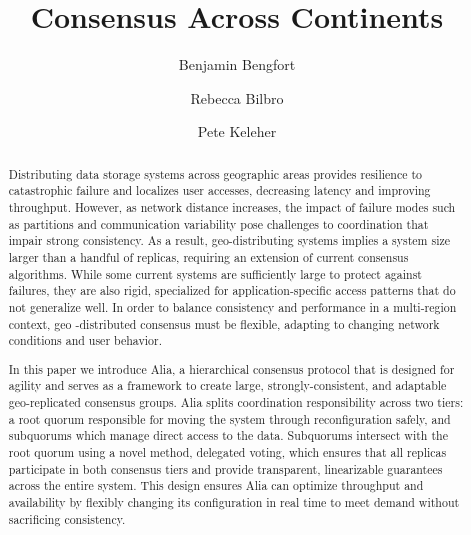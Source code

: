 \documentclass[sigplan,screen,review,anonymous,nonacm]{acmart}
\begin{document}
\title{Consensus Across Continents}

\author{Benjamin Bengfort}
\orcid{}

\author{Rebecca Bilbro}
\orcid{}

\author{Pete Keleher}
\orcid{}



\begin{abstract}
Distributing data storage systems across geographic areas provides resilience
to catastrophic failure and localizes user accesses, decreasing latency and improving 
throughput. 
However, as network distance increases, the impact of failure modes such as partitions 
and communication variability pose challenges to coordination that impair strong 
consistency.
As a result, geo-distributing systems implies a system size larger than a handful of 
replicas, requiring an extension of current consensus algorithms.
While some current systems are sufficiently large to protect against failures, they are 
also rigid, specialized for application-specific access patterns that do not generalize 
well. 
In order to balance consistency and performance in a multi-region context, geo -distributed
consensus must be flexible, adapting to changing network conditions and user behavior. 

In this paper we introduce Alia, a hierarchical consensus protocol that is designed for 
agility and serves as a framework to create large, strongly-consistent, and adaptable 
geo-replicated consensus groups. 
Alia splits coordination responsibility across two tiers: a root quorum responsible for 
moving the system through reconfiguration safely, and subquorums which manage direct
access to the data. 
Subquorums intersect with the root quorum using a novel method, delegated voting, which 
ensures that all replicas participate in both consensus tiers and provide transparent, 
linearizable guarantees across the entire system. 
This design ensures Alia can optimize throughput and availability by flexibly changing its 
configuration in real time to meet demand without sacrificing consistency. 
\end{abstract}
\end{document}
